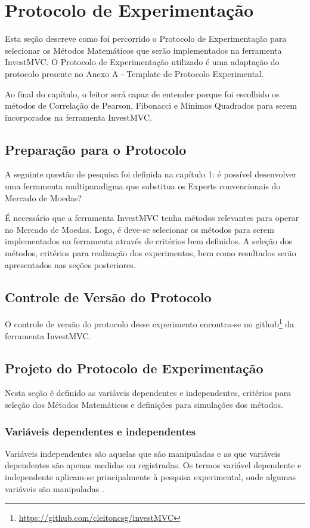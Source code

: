 \chapter{Protocolo de Experimentação}

Esta seção descreve como foi percorrido o Protocolo de Experimentação para selecionar os Métodos Matemáticos que serão implementados na ferramenta InvestMVC. O Protocolo de Experimentação utilizado é uma adaptação do protocolo presente no Anexo A - Template de Protocolo Experimental.

Ao final do capítulo, o leitor será capaz de entender porque foi escolhido os métodos de Correlação de Pearson, Fibonacci e Mínimos Quadrados para serem incorporados na ferramenta InvestMVC.

\section{Preparação para o Protocolo}

A seguinte questão de pesquisa foi definida na capítulo 1: é possível desenvolver uma ferramenta multiparadigma que substitua os Experts convencionais do Mercado de Moedas? 

É necessário que a ferramenta InvestMVC tenha métodos relevantes para operar no Mercado de Moedas. Logo, é deve-se selecionar os métodos para serem implementados na ferramenta através de critérios bem definidos. A seleção dos métodos, critérios para realização dos experimentos, bem como resultados serão apresentados nas seções posteriores.

\section{Controle de Versão do Protocolo}

O controle de versão do protocolo desse experimento encontra-se no github\footnote{\url{https://github.com/cleitoncsg/investMVC}} da ferramenta InvestMVC.

\section{Projeto do Protocolo de Experimentação}

Nesta seção é definido as variáveis dependentes e independentes, critérios para seleção dos Métodos Matemáticos e definições para simulações dos métodos.


\subsection{Variáveis dependentes e independentes}
Variáveis independentes são aquelas que são manipuladas e as que variáveis dependentes são apenas medidas ou registradas. Os termos variável dependente e independente aplicam-se principalmente à pesquisa experimental, onde algumas variáveis são manipuladas \cite[pág.~13]{hoppen2010}.

